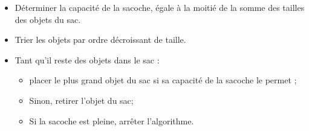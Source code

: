 \begin{itemize}
\item Déterminer la capacité de la sacoche, égale à la moitié de la somme des tailles des objets du sac.
\item Trier les objets par ordre décroissant de taille.
\item Tant qu'il reste des objets dans le sac :
  \begin{itemize}
  \item placer le plus grand objet du sac si sa capacité de la sacoche le permet ;
  \item Sinon, retirer l'objet du sac;
  \item Si la sacoche est pleine, arrêter l'algorithme.
  \end{itemize}
\end{itemize}
